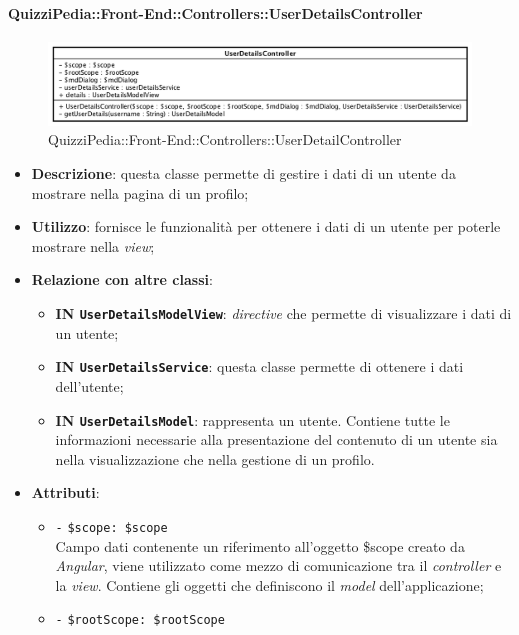 \paragraph{QuizziPedia::Front-End::Controllers::UserDetailsController}
\begin{figure} [ht]
	\centering
	\includegraphics[scale=0.5]{UML/Classi/Front-End/QuizziPedia_Front-end_Controller_UserDetailController.png}
	\caption{QuizziPedia::Front-End::Controllers::UserDetailController}
\end{figure} \FloatBarrier
\begin{itemize}
	\item \textbf{Descrizione}: questa classe permette di gestire i dati di un utente da mostrare nella pagina di un profilo;
	\item \textbf{Utilizzo}: fornisce le funzionalità per ottenere i dati di un utente per poterle mostrare nella \textit{view};
	\item \textbf{Relazione con altre classi}:
	\begin{itemize}
		\item \textbf{IN \texttt{UserDetailsModelView}}: \textit{directive} che permette di visualizzare i dati di un utente; 
		\item \textbf{IN \texttt{UserDetailsService}}: questa classe permette di ottenere i dati dell'utente;
		\item \textbf{IN \texttt{UserDetailsModel}}: rappresenta un utente. Contiene tutte le informazioni necessarie alla presentazione del contenuto di un utente sia nella visualizzazione che nella gestione di un profilo.
	\end{itemize}
	\item \textbf{Attributi}:
	\begin{itemize}
		\item \texttt{-} \texttt{\$scope: \$scope} \\
		Campo dati contenente un riferimento all'oggetto \$scope creato da \textit{Angular}, viene utilizzato come mezzo di comunicazione tra il \textit{controller} e la \textit{view}. Contiene gli oggetti che definiscono il \textit{model} dell'applicazione;
		\item \texttt{-} \texttt{\$rootScope: \$rootScope} \\

\end{itemize}
\end{itemize}
